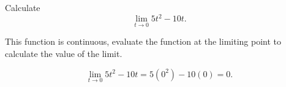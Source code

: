 \documentclass{ximera}
\author{Emma Smith Zbarsky}
\begin{document}
\begin{exercise}

Calculate \[\lim_{t\to 0} 5t^2-10t.\]


\begin{hint}
This function is continuous, evaluate the function at the limiting point
to calculate the value of the limit.
\end{hint}


\begin{hint}
\[\lim_{t\to 0} 5t^2-10t = 5(0^2)-10(0) = 0.\]
\end{hint}


\begin{multipleChoice}
\choice{$\infty$}
\end{multipleChoice}

\end{exercise}
\end{document}
